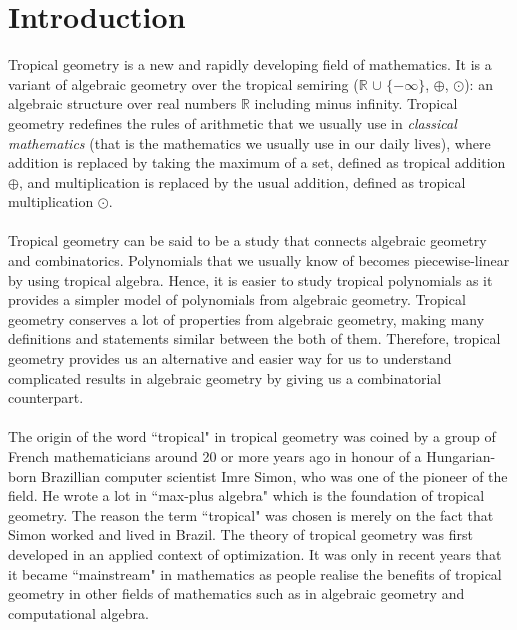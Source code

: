 \documentclass[]{article}
\theoremstyle{definition}
\numberwithin{equation}{section}
\newcommand{\R}{\mathbb{R}}
\renewcommand{\.}{\,.}
\begin{document}
\section{Introduction}
\hspace*{3mm} Tropical geometry is a new and rapidly developing field of mathematics. It is a variant of algebraic geometry over the tropical semiring ($\R$  $\cup$ $\{-\infty\}$, $\oplus$, $\odot$): an algebraic structure over real numbers $\R$ including minus infinity. Tropical geometry redefines the rules of arithmetic that we usually use in \emph{classical mathematics} (that is the mathematics we usually use in our daily lives), where addition is replaced by taking the maximum of a set, defined as tropical addition $\oplus$, and multiplication is replaced by the usual addition, defined as tropical multiplication $\odot$. \\ \\
 \hspace*{3mm}Tropical geometry can be said to be a study that connects algebraic geometry and combinatorics. Polynomials that we usually know of becomes piecewise-linear by using tropical algebra. Hence, it is easier to study tropical polynomials as it provides a simpler model of polynomials from algebraic geometry. Tropical geometry conserves a lot of properties from algebraic geometry, making many definitions and statements similar between the both of them. Therefore, tropical geometry provides us an alternative and easier way for us to understand complicated results in algebraic geometry by giving us a combinatorial counterpart.   \\
\\
\hspace*{3mm}The origin of the word ``tropical" in tropical geometry was coined by a group of French mathematicians around 20 or more years ago in honour of a Hungarian-born Brazillian computer scientist Imre Simon, who was one of the pioneer of the field. He wrote a lot in ``max-plus algebra" which is the foundation of tropical geometry. The reason the term ``tropical" was chosen is merely on the fact that Simon worked and lived in Brazil. The theory of tropical geometry was first developed in an applied context of optimization. It was only in recent years that it became ``mainstream" in mathematics as people realise the benefits of tropical geometry in other fields of mathematics such as in algebraic geometry and computational algebra.     \\ \\
\end{document}
